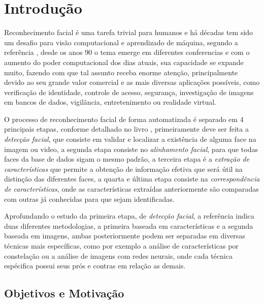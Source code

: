 
\chapter[Introdução]{Introdução}

Reconhecimento facial é uma tarefa trivial para humanos e há décadas tem sido um desafio para visão computacional e aprendizado de máquina, segundo a referência , desde os anos 90 o tema emerge em diferentes conferencias e com o aumento do poder computacional dos dias atuais, sua capacidade se expande muito, fazendo com que tal assunto receba enorme atenção, principalmente devido ao seu grande valor comercial e as mais diversas aplicações possíveis, como verificação de identidade, controle de acesso, segurança, investigação de imagens em bancos de dados, vigilância, entretenimento ou realidade virtual. \cite{appli2014} \cite{Zhao:2003:FRL:954339.954342}

O processo de reconhecimento facial de forma automatizada é separado em 4 principais etapas, conforme detalhado no livro , primeiramente deve ser feita a \textit{detecção facial}, que consiste em validar e localizar a existência de alguma face na imagem ou video, a segunda etapa consiste no \textit{alinhamento facial}, para que todas faces da base de dados sigam o mesmo padrão, a terceira etapa é a \textit{extração de características} que permite a obtenção de informação efetiva que será útil na distinção das diferentes faces, a quarta e última etapa consiste na \textit{correspondência de características}, onde as características extraídas anteriormente são comparadas com outras já conhecidas para que sejam identificadas.

Aprofundando o estudo da primeira etapa, de \textit{detecção facial}, a referência  indica duas diferentes metodologias, a primeira baseada em características e a segunda baseada em imagens, ambas posteriormente podem ser separadas em diversas técnicas mais específicas, como por exemplo a análise de características por constelação ou a análise de imagens com redes neurais, onde cada técnica espécifica possui seus prós e contras em relação as demais.

\section{Objetivos e Motivação}

